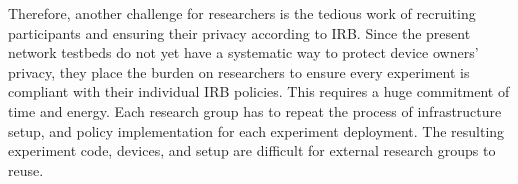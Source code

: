 Therefore, another challenge for researchers is the tedious work
of recruiting participants and ensuring their privacy according to IRB. 
Since the present network testbeds do not yet have a systematic 
way to protect device owners' privacy, they place 
the burden on researchers to ensure every 
experiment is compliant with their individual IRB policies.
This requires a huge commitment 
of time and energy. Each research group has to repeat the process 
of infrastructure setup, and policy implementation for each 
experiment deployment. The resulting 
experiment code, devices, and setup are 
difficult for external research groups to reuse.



